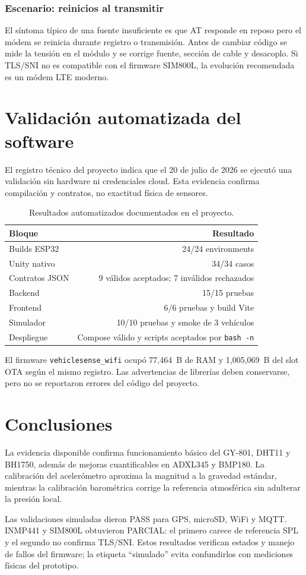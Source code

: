 \documentclass[11pt,a4paper,oneside]{report}
\begin{document}
\subsection*{Escenario: reinicios al transmitir}
El síntoma típico de una fuente insuficiente es que AT responde en reposo pero el módem
se reinicia durante registro o transmisión. Antes de cambiar código se mide la tensión
en el módulo y se corrige fuente, sección de cable y desacoplo. Si TLS/SNI no es
compatible con el firmware SIM800L, la evolución recomendada es un módem LTE moderno.

\chapter{Validación automatizada del software}

El registro técnico del proyecto indica que el 20 de julio de 2026 se ejecutó una
validación sin hardware ni credenciales cloud. Esta evidencia confirma compilación y
contratos, no exactitud física de sensores.

\begin{table}[H]\centering
\caption{Resultados automatizados documentados en el proyecto.}
\begin{tabularx}{\textwidth}{@{}Y r@{}}
\toprule
\textbf{Bloque} & \textbf{Resultado}\\
\midrule
Builds ESP32 & 24/24 environments\\
Unity nativo & 34/34 casos\\
Contratos JSON & 9 válidos aceptados; 7 inválidos rechazados\\
Backend & 15/15 pruebas\\
Frontend & 6/6 pruebas y build Vite\\
Simulador & 10/10 pruebas y smoke de 3 vehículos\\
Despliegue & Compose válido y scripts aceptados por \texttt{bash -n}\\
\bottomrule
\end{tabularx}
\end{table}

El firmware \texttt{vehiclesense\_wifi} ocupó 77,464~B de RAM y 1,005,069~B del
slot OTA según el mismo registro. Las advertencias de librerías deben conservarse,
pero no se reportaron errores del código del proyecto.

\chapter{Conclusiones}
La evidencia disponible confirma funcionamiento básico del GY-801, DHT11 y BH1750,
además de mejoras cuantificables en ADXL345 y BMP180. La calibración del acelerómetro
aproxima la magnitud a la gravedad estándar, mientras la calibración barométrica
corrige la referencia atmosférica sin adulterar la presión local.

Las validaciones simuladas dieron PASS para GPS, microSD, WiFi y MQTT. INMP441 y
SIM800L obtuvieron PARCIAL: el primero carece de referencia SPL y el segundo no
confirma TLS/SNI. Estos resultados verifican estados y manejo de fallos del firmware;
la etiqueta ``simulado'' evita confundirlos con mediciones físicas del prototipo.
\end{document}
